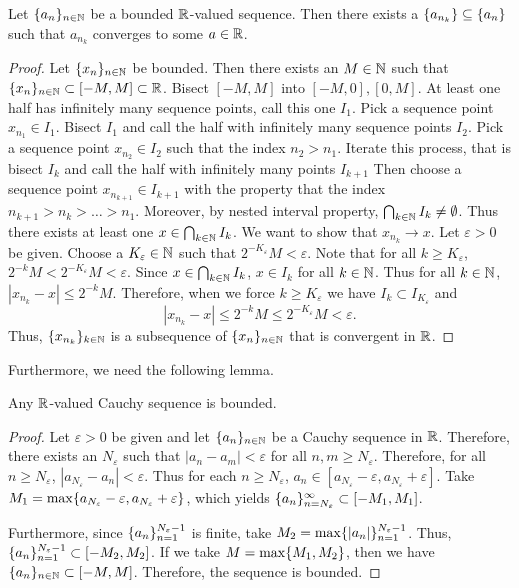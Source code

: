 \documentclass[notitlepage]{simple}
\begin{document}
\begin{thm}
	Let $\lbrace a_n \rbrace_{n\in\mathbb{N}}$ be a bounded $\mathbb{R}$-valued sequence.
	Then there exists a $\lbrace a_{n_k} \rbrace\subseteq\lbrace a_n \rbrace$ such that $a_{n_k}$ converges to some $a\in\mathbb{R}$.
\end{thm}
\begin{proof}
	Let $\lbrace x_n \rbrace_{n\in\mathbb{N}}$ be bounded.
	Then there exists an $M\in\mathbb{N}$ such that $\lbrace x_n \rbrace_{n\in\mathbb{N}}\subset[-M,M]\subset\mathbb{R}$.
	Bisect $[-M,M]$ into $[-M,0],[0,M]$.
	At least one half has infinitely many sequence points, call this one $I_1$.
	Pick a sequence point $x_{n_1}\in I_1$.
	Bisect $I_1$ and call the half with infinitely many sequence points $I_2$.
	Pick a sequence point $x_{n_2}\in I_2$ such that the index $n_2>n_1$.
	Iterate this process, that is bisect $I_k$ and call the half with infinitely many points $I_{k+1}$
	Then choose a sequence point $x_{n_{k+1}}\in I_{k+1}$ with the property that the index $n_{k+1}>n_k>\ldots > n_1$.
	Moreover, by nested interval property, $\bigcap_{k\in\mathbb{N}} I_k\neq\emptyset$.
	Thus there exists at least one $x\in \bigcap_{k\in\mathbb{N}} I_k$.
	We want to show that $x_{n_k}\rightarrow x$.
	Let $\varepsilon> 0$ be given.
	Choose a $K_\varepsilon\in\mathbb{N}$ such that $2^{-K_\varepsilon}M< \varepsilon$.
	Note that for all $k\geq K_\varepsilon$, $2^{-k} M <  2^{-K_\varepsilon}M< \varepsilon$.
	Since $x\in \bigcap_{k\in\mathbb{N}} I_k$, $x\in I_k$ for all $k\in\mathbb{N}$.
	Thus for all $k\in\mathbb{N}$, $|x_{n_k}-x|\leq 2^{-k}M$.
	Therefore, when we force $k\geq K_\varepsilon$ we have $I_k\subset I_{K_\varepsilon}$ and
	\[
	|x_{n_k}-x|\leq 2^{-k}M \leq 2^{-K_\varepsilon} M < \varepsilon.
	\]
	Thus, $\lbrace x_{n_k} \rbrace_{k\in\mathbb{N}}$ is a subsequence of $\lbrace x_n \rbrace_{n\in\mathbb{N}}$ that is convergent in $\mathbb{R}$.
\end{proof}

Furthermore, we need the following lemma.

\begin{lemma}
	Any $\mathbb{R}$-valued Cauchy sequence is bounded.
\end{lemma}
\begin{proof}
	Let $\varepsilon >0$ be given and let $\lbrace a_n \rbrace_{n\in\mathbb{N}}$ be a Cauchy sequence in $\mathbb{R}$.
	Therefore, there exists an $N_\varepsilon$ such that $|a_n-a_m|<\varepsilon$ for all $n,m\geq N_\varepsilon$.
	Therefore, for all $n\geq N_\varepsilon$, $|a_{N_\varepsilon}-a_n|<\varepsilon$.
	Thus for each $n\geq N_\varepsilon$, $a_n\in[a_{N_\varepsilon}-\varepsilon,a_{N_\varepsilon}+\varepsilon]$.
	Take $M_1=\max\lbrace a_{N_\varepsilon}-\varepsilon,a_{N_\varepsilon}+\varepsilon \rbrace$, which yields $\lbrace a_n \rbrace_{n=N_\varepsilon}^\infty\subset[-M_1,M_1]$.

	Furthermore, since $\lbrace a_n \rbrace_{n=1}^{N_\varepsilon-1}$ is finite, take $M_2=\max\lbrace |a_n| \rbrace_{n=1}^{N_\varepsilon-1}$.
	Thus, $\lbrace a_n \rbrace_{n=1}^{N_\varepsilon-1}\subset [-M_2,M_2]$.
	If we take $M=\max\lbrace M_1,M_2 \rbrace$, then we have $\lbrace a_n \rbrace_{n\in\mathbb{N}}\subset[-M,M]$.
	Therefore, the sequence is bounded.
\end{proof}
\end{document}
